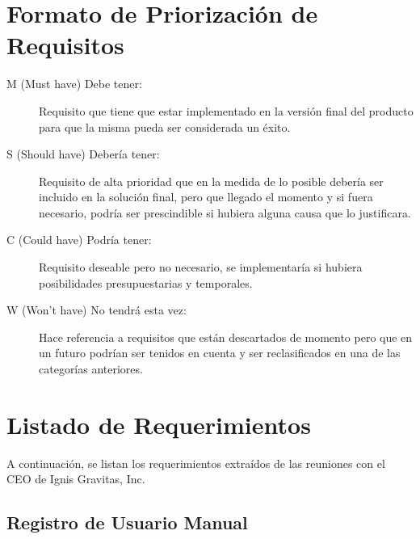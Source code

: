 \section{Formato de Priorización de Requisitos}

\begin{description}
    \item[M (Must have) Debe tener:] Requisito que tiene que estar implementado en la versión final del producto para que la misma pueda ser considerada un éxito.
    \item[S (Should have) Debería tener:] Requisito de alta prioridad que en la medida de lo posible debería ser incluido en la solución final, pero que llegado el momento y si fuera necesario, podría ser prescindible si hubiera alguna causa que lo justificara.
    \item[C (Could have) Podría tener:] Requisito deseable pero no necesario, se implementaría si hubiera posibilidades presupuestarias y temporales.
    \item[W (Won’t have) No tendrá esta vez:] Hace referencia a requisitos que están descartados de momento pero que en un futuro podrían ser tenidos en cuenta y ser reclasificados en una de las categorías anteriores.
\end{description}

\section{Listado de Requerimientos}

A continuación, se listan los requerimientos extraídos de las reuniones con el CEO de Ignis Gravitas, Inc.

\subsection{Registro de Usuario Manual}

